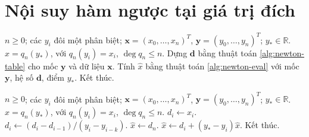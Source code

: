 \documentclass[12pt,a4paper,oneside]{book}
\numberwithin{algorithm}{chapter}
\theoremstyle{definition}
\newcommand{\R}{\mathbb{R}}
\begin{document}
\section{Nội suy hàm ngược tại giá trị đích}
\begin{algorithm}[H]
\caption{Nội suy ngược: sơ lược}
\label{alg:inverse-interpolation-short}
\begin{algorithmic}[1]
\Require $n\geq0$; các $y_i$ đôi một phân biệt; $\boldsymbol x=(x_0,\ldots,x_n)^T$, $\boldsymbol y=(y_0,\ldots,y_n)^T$; $y_\ast\in\R$.
\Ensure $\widehat x=q_n(y_\ast)$, với $q_n(y_i)=x_i$, $\deg q_n\leq n$.
\State Dựng $\boldsymbol d$ bằng thuật toán \ref{alg:newton-table} cho mốc $\boldsymbol y$ và dữ liệu $\boldsymbol x$.
\State Tính $\widehat x$ bằng thuật toán \ref{alg:newton-eval} với mốc $\boldsymbol y$, hệ số $\boldsymbol d$, điểm $y_\ast$.
\State Kết thúc.
\end{algorithmic}
\end{algorithm}
\begin{algorithm}[H]
\caption{Nội suy ngược: chi tiết}
\label{alg:inverse-interpolation}
\begin{algorithmic}[1]
\Require $n\geq0$; các $y_i$ đôi một phân biệt; $\boldsymbol x=(x_0,\ldots,x_n)^T$, $\boldsymbol y=(y_0,\ldots,y_n)^T$; $y_\ast\in\R$.
\Ensure $\widehat x=q_n(y_\ast)$, với $q_n(y_i)=x_i$, $\deg q_n\leq n$.
 \State $d_i\gets x_i$.
\EndFor
\Statex
{}
  \State $d_i\gets(d_i-d_{i-1})/(y_i-y_{i-k})$.
 \EndFor
\EndFor
\Statex
\State $\widehat x\gets d_n$.
 \State $\widehat x\gets d_i+(y_\ast-y_i)\widehat x$.
\EndFor
\Statex
\State Kết thúc.
\end{algorithmic}
\end{algorithm}

\end{document}
